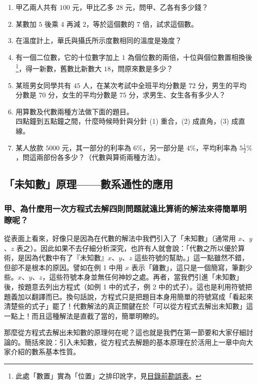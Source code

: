\begin{enumerate}[1.]
  \item 甲乙兩人共有 $100$ 元，甲比乙多 $28$ 元，問甲、乙各有多少錢？
  \item 某數加 $5$ 後乘 $4$ 再減 $2$，等於這個數的 $7$ 倍，試求這個數。
  \item 在溫度計上，華氏與攝氏所示度數相同的溫度是幾度？
  \item 有一個二位數，它的十位數字加上 $1$ 為個位數的兩倍，十位與個位數置相換後\footnote{此處「數置」實為「位置」之排印訛字，見\hyperref[sec:master_errata_notes]{目錄前勘誤表}。}，得一新數，舊數比新數大 $18$，問原來數是多少？\label{item:ex4-1-4}
  \item 某班男女同學共有 $45$ 人，在某次考試中全班平均分數是 $72$ 分，男生的平均分數是 $70$ 分，女生的平均分數是 $75$ 分，求男生、女生各有多少人？
  \item 用算數及代數兩種方法做下面的題目。\\
  四點鐘到五點鐘之間，什麼時候時針與分針 (1) 重合，(2) 成直角，(3) 成直線。
  \item[$*7.$] 某人放款 $5000$ 元，其一部分的利率為 $6\%$，另一部分是 $4\%$，平均利率為 $5\frac{1}{2}\%$，問這兩部份各多少？（代數與算術兩種方法）。
\end{enumerate}

\subsection{「未知數」原理——數系通性的應用}\label{sec:4-2}

\subsubsection*{甲、為什麼用一次方程式去解四則問題就遠比算術的解法來得簡單明瞭呢？}\label{subsec:4-2-a}

從表面上看來，好像只是因為在代數的解法中我們引入了「未知數」（通常用 $x$、$y$、$z$ 表之）。因此如果不去仔細分析深究，也許有人就會說：「代數之所以優於算術，是因為代數中有了『未知數』$x$、$y$、$z$ 這些符號的幫助。」這一點雖然不錯，但卻不是根本的原因。譬如在例 1 中用 $x$ 表示「雞數」，這只是一個簡寫，筆劃少些。$x$、$y$、$z$，這些符號本身並無任何神妙之處。再者，當我們引進「未知數」後，按題意去列出方程式（如例 1 中的式子，例 2 中的式子）。這也是利用符號把題義加以翻譯而已。換句話說，方程式只是把題目本身用簡單的符號寫成「看起來清楚些的式子」罷了！代數解法的真正關鍵在於「可以從方程式去解出未知數」這一點上！而且這種解法是直截了當的，簡單明瞭的。

那麼從方程式去解出未知數的原理何在呢？這也就是我們在第一節要和大家仔細討論的。簡括來說：引入未知數，從方程式去解題的基本原理在於活用上一章中向大家介紹的數系基本性質。

